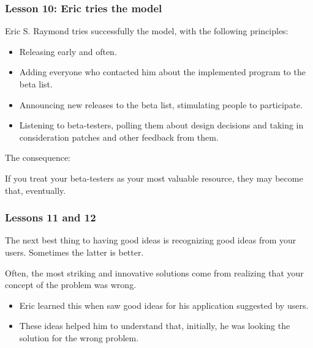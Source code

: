 \documentclass{beamer}
\begin{document}
\begin{frame}
\frametitle{Lesson 10: Eric tries the model}

Eric S. Raymond tries successfully the model, with the following
principles:
\begin{itemize}
\item Releasing early and often.
\item Adding everyone who contacted him about the
  implemented program to the beta list.
\item Announcing new releases to the beta list, stimulating people to
  participate.
\item Listening to beta-testers, polling them about design decisions
  and taking in consideration patches and other feedback from them.
\end{itemize}

The consequence:
\begin{center}
{\large If you treat your beta-testers as your most
  valuable resource, they may become that, eventually.
}
\end{center}

\end{frame}

\begin{frame}
\frametitle{Lessons 11 and 12}

\begin{center}
{\large The next best thing to having good ideas is recognizing good
  ideas from your users. Sometimes the latter is better.
}
\end{center}

\begin{center}
{\large Often, the most striking and innovative solutions come from
  realizing that your concept of the problem was wrong.}
\end{center}

\begin{itemize}
\item Eric learned this when saw good ideas for his application
  suggested by users.
\item These ideas helped him to understand that, initially, he was
  looking the solution for the wrong problem.
\end{itemize}

\end{frame}
\end{document}
